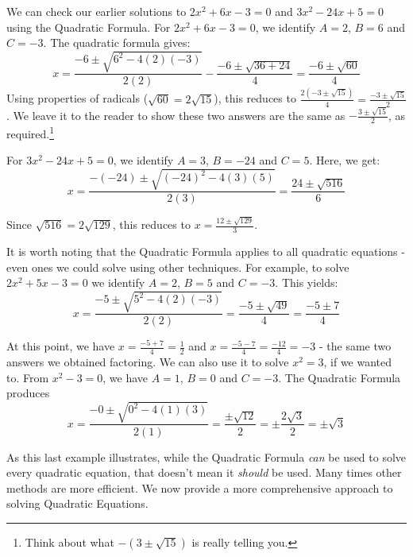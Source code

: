 \documentclass[11pt]{article}
\theoremstyle{definition}  %
\begin{document}
\medskip

We can check our earlier solutions to $2x^2 + 6x - 3 = 0$ and $3x^2 - 24x + 5 = 0$ using the Quadratic Formula.  For $2x^2 + 6x - 3 = 0$, we identify $A = 2$, $B = 6$ and $C = -3$.  The quadratic formula gives: \[ x = \dfrac{-6 \pm \sqrt{6^2 - 4(2)(-3)}}{2(2)} - \dfrac{-6 \pm \sqrt{36 + 24}}{4} = \dfrac{-6 \pm \sqrt{60}}{4} \] Using properties of radicals ($\sqrt{60} = 2 \sqrt{15}$), this reduces to $\frac{2(-3 \pm \sqrt{15})}{4} =\frac{-3 \pm \sqrt{15}}{2}$. We leave it to the reader to show these two answers are the same as $-\frac{3 \pm \sqrt{15}}{2}$,  as required.\footnote{Think about what $-(3 \pm \sqrt{15})$ is really telling you.}  

\smallskip

For $3x^2 - 24x + 5 = 0$, we identify $A = 3$, $B = -24$ and $C = 5$.  Here, we get: \[ x = \dfrac{-(-24) \pm \sqrt{(-24)^2 - 4(3)(5)}}{2(3)} = \dfrac{24 \pm \sqrt{516}}{6} \]

Since $\sqrt{516} = 2\sqrt{129}$, this reduces to  $x = \frac{12 \pm \sqrt{129}}{3}$. 

\smallskip

It is worth noting that the Quadratic Formula applies to all quadratic equations - even ones we could solve using other techniques.  For example, to solve $2x^2 + 5x - 3 = 0$  we identify $A = 2$, $B = 5$ and $C = -3$.  This yields: \[ x = \dfrac{-5 \pm \sqrt{5^2 - 4(2)(-3)}}{2(2)} = \dfrac{-5 \pm \sqrt{49}}{4} = \dfrac{-5 \pm 7}{4} \]

At this point, we have $x = \frac{-5+7}{4} = \frac{1}{2}$ and $x = \frac{-5-7}{4} = \frac{-12}{4} = -3$ - the same two answers we obtained factoring.  We can also use it to solve $x^2 = 3$, if we wanted to.  From $x^2 -3 = 0$, we have $A = 1$, $B = 0$ and $C = -3$.  The Quadratic Formula produces \[ x = \dfrac{-0 \pm \sqrt{0^2 - 4(1)(3)}}{2(1)} = \dfrac{\pm\sqrt{12}}{2} = \pm \dfrac{2\sqrt{3}}{2} = \pm \sqrt{3}\]

As this last example illustrates, while the  Quadratic Formula \textit{can} be used to solve every quadratic equation, that doesn't mean it \textit{should} be used.  Many times other methods are more efficient.  We now provide a more comprehensive approach to solving Quadratic Equations.  

\medskip

\label{solvequadraticeqns}
\end{document}

